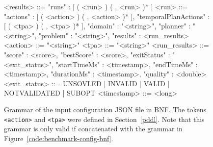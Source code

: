 \begin{figure}[tbp]
\centering
\begin{code}
<results> ::= { "runs" : [ ( <run> ) ( , <run> )* ] }
<run> ::= { "actions" : [ ( <action> ) ( , <action> )* ],
            "temporalPlanActions" : [ ( <tpa> ) ( , <tpa> )* ],
            "domain" : "<string>",
            "planner" : "<string>",
            "problem" : "<string>",
            "results" : <run_results> }
<action> ::= "<string>"
<tpa> ::= "<string>"
<run_results> ::= { "score" : <score>,
                    "bestScore" : <score>,
                    "exitStatus" : "<exit_status>",
                    "startTimeMs" : <timestamp>,
                    "endTimeMs" : <timestamp>,
                    "durationMs" : <timestamp>,
                    "quality" : <double> }
<exit_status> ::= UNSOVLED | INVALID | VALID | NOTVALIDATED | SUBOPT
<timestamp> ::= <long>
\end{code}
\caption[Grammar of the input configuration JSON file in BNF.]{Grammar of the input configuration JSON file in BNF.
The tokens \texttt{<action>} and \texttt{<tpa>} were defined in Section~\ref{pddl}. Note
that this grammar is only valid if concatenated with the grammar in Figure~\ref{code:benchmark-config-bnf}.}
\label{code:benchmark-results-bnf}
\end{figure}



\newpage

